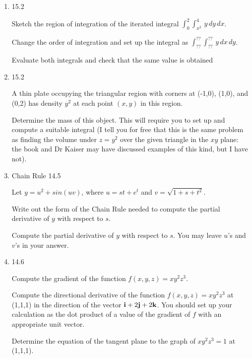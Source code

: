 \documentclass[12pt]{article}
\begin{document}
\begin{enumerate}
\newpage

\item  15.2

  Sketch the region of integration of the iterated integral $\int_0^2\int_{x^2}^4 \, y \,dy\,dx$.

\vspace{1.5 in}

Change the order of integration and set up the integral as $\int_{??}^{??} \int_{??}^{??}\,y\,dx\,dy$.

\vspace{1.5 in}

Evaluate both integrals and check that the same value is obtained

\newpage

\item 15.2

A thin plate occupying the triangular region with corners at (-1,0), (1,0), and (0,2) has density $y^2$ at each point $(x,y)$ in this region.

Determine the mass of this object.  This will require you to set up and compute a suitable integral (I tell you for free that this is the same problem
as finding the volume  under $z=y^2$ over the given triangle in the $xy$ plane:  the book and Dr Kaiser may have discussed examples of this kind, but I have not).

\newpage

\item  Chain Rule  14.5

Let $y = u^2 + sin(uv)$, where $u= st + e^t$ and $v = \sqrt{1+s+t^2}$.

Write out the form of the Chain Rule needed to compute the partial derivative of $y$ with respect to $s$.

Compute the partial derivative of $y$ with respect to $s$.  You may
leave $u$'s and $v$'s in your answer.

\newpage 

\item 14.6 

Compute the gradient of the function $f(x,y,z) = xy^2z^3$.  

Compute the directional derivative of the function $f(x,y,z) =
xy^2z^3$ at (1,1,1) in the direction of the vector ${\bf i} + 2{\bf j}
+ 2{\bf k}$.  You should set up your calculation as the dot product of
a value of the gradient of $f$ with an appropriate unit vector.

Determine the equation of the tangent plane to the graph of
$xy^2z^3=1$ at (1,1,1).


\end{enumerate}
\end{document}
